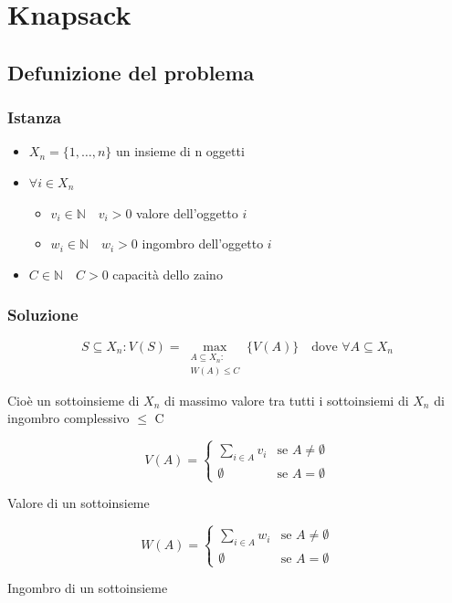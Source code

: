 \chapter{Knapsack}

\section{Defunizione del problema}

\subsection{Istanza}
\begin{itemize}
    \item $X_n = \{1, \dots, n\}$ un insieme di n oggetti
    \item $\forall i \in X_n$
    \begin{itemize}
        \item $v_i \in \mathbb{N} \quad v_i > 0$ valore dell'oggetto $i$
        \item $w_i \in \mathbb{N} \quad w_i > 0$ ingombro dell'oggetto $i$
    \end{itemize}
    \item $C \in \mathbb{N} \quad C>0$ capacità dello zaino
\end{itemize}

\subsection{Soluzione}
{
    \large
    $$
    S \subseteq X_n : V(S) = \max_{\substack{A \subseteq X_n : \\ W(A) \leq C}} \{ V(A) \} \quad \text{dove } \forall A \subseteq X_n
    $$
}

Cioè un sottoinsieme di $X_n$ di massimo valore tra tutti i sottoinsiemi di $X_n$ di ingombro complessivo $\leq$ C

\begin{minipage}{0.45\textwidth}
    $$
    V(A) = 
    \begin{cases}
        \sum_{i \in A} v_i & \text{se } A \not = \emptyset \\
        \emptyset & \text{se } A = \emptyset
    \end{cases}
    $$

    \begin{center}
        Valore di un sottoinsieme
    \end{center}
\end{minipage}
\hfil
\begin{minipage}{0.45\textwidth}
    $$
        W(A) = 
        \begin{cases}
            \sum_{i \in A} w_i & \text{se } A \not = \emptyset \\
            \emptyset & \text{se } A = \emptyset
        \end{cases}
    $$

    \begin{center}
        Ingombro di un sottoinsieme
    \end{center}
\end{minipage}


